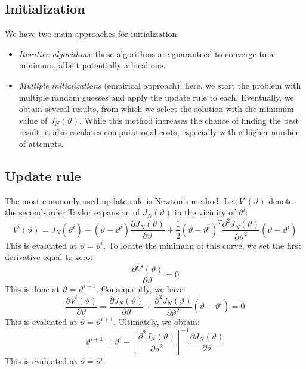 \subsection{Initialization}
We have two main approaches for initialization:
\begin{itemize}
    \item \textit{Iterative algorithms}: these algorithms are guaranteed to converge to a minimum, albeit potentially a local one.
    \item \textit{Multiple initializations} (empirical approach): here, we start the problem with multiple random guesses and apply the update rule to each. 
        Eventually, we obtain several results, from which we select the solution with the minimum value of $J_N(\vartheta)$. 
        While this method increases the chance of finding the best result, it also escalates computational costs, especially with a higher number of attempts.
\end{itemize}

\subsection{Update rule}
The most commonly used update rule is Newton's method. 
Let $V^i(\vartheta)$ denote the second-order Taylor expansion of $J_N(\vartheta)$ in the vicinity of $\vartheta^i$:
\[V^{i}(\vartheta)=J_N(\vartheta^i)+(\vartheta-\vartheta^i)\dfrac{\partial J_N(\vartheta)}{\partial\vartheta}+\dfrac{1}{2}(\vartheta-\vartheta^i)^T\dfrac{\partial^2 J_N(\vartheta)}{\partial\vartheta^2}(\vartheta-\vartheta^i)\]
This is evaluated at $\vartheta=\vartheta^i$. 
To locate the minimum of this curve, we set the first derivative equal to zero:
\[\dfrac{\partial V^i(\vartheta)}{\partial\vartheta}=0\]
This is done at $\vartheta=\vartheta^{i+1}$. 
Consequently, we have:
\[\dfrac{\partial V^i(\vartheta)}{\partial\vartheta}=\dfrac{\partial J_N(\vartheta)}{\partial\vartheta}+\dfrac{\partial^2 J_N(\vartheta)}{\partial\vartheta^2}(\vartheta-\vartheta^i)=0\]
This is evaluated at $\vartheta=\vartheta^{i+1}$. 
Ultimately, we obtain:
\[\vartheta^{i+1}=\vartheta^i-\left[ \dfrac{\partial^2 J_N(\vartheta)}{\partial\vartheta^2} \right]^{-1}\dfrac{\partial J_N(\vartheta)}{\partial\vartheta}\]
This is evaluated at $\vartheta=\vartheta^{i}$.

